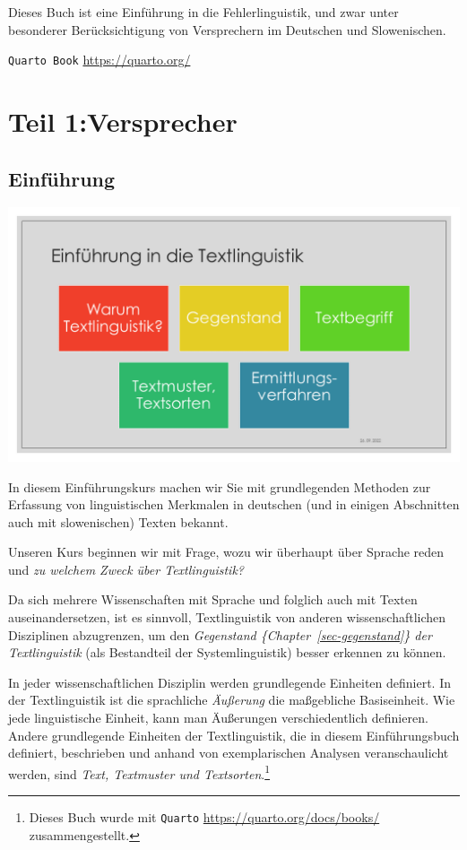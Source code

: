\documentclass[
  letterpaper,
]{scrbook}
\begin{document}
Dieses Buch ist eine Einführung in die Fehlerlinguistik, und zwar unter
besonderer Berücksichtigung von Versprechern im Deutschen und
Slowenischen.

\texttt{Quarto\ Book} \url{https://quarto.org/}

\part{Teil 1:Versprecher}

\hypertarget{sec-einfuhrung}{%
\chapter{Einführung}\label{sec-einfuhrung}}

\includegraphics[width=1\textwidth,height=\textheight]{./pictures/Diapozitiv5.PNG}

In diesem Einführungskurs machen wir Sie mit grundlegenden Methoden zur
Erfassung von linguistischen Merkmalen in deutschen (und in einigen
Abschnitten auch mit slowenischen) Texten bekannt.

Unseren Kurs beginnen wir mit Frage, wozu wir überhaupt über Sprache
reden und \emph{zu welchem Zweck über Textlinguistik?}

Da sich mehrere Wissenschaften mit Sprache und folglich auch mit Texten
auseinandersetzen, ist es sinnvoll, Textlinguistik von anderen
wissenschaftlichen Disziplinen abzugrenzen, um den \emph{Gegenstand
\{Chapter~\ref{sec-gegenstand}\} der Textlinguistik} (als Bestandteil
der Systemlinguistik) besser erkennen zu können.

In jeder wissenschaftlichen Disziplin werden grundlegende Einheiten
definiert. In der Textlinguistik ist die sprachliche \emph{Äußerung} die
maßgebliche Basiseinheit. Wie jede linguistische Einheit, kann man
Äußerungen verschiedentlich definieren. Andere grundlegende Einheiten
der Textlinguistik, die in diesem Einführungsbuch definiert, beschrieben
und anhand von exemplarischen Analysen veranschaulicht werden, sind
\emph{Text, Textmuster und Textsorten}.\footnote{Dieses Buch wurde mit
  \texttt{Quarto} \url{https://quarto.org/docs/books/} zusammengestellt.}
\end{document}
